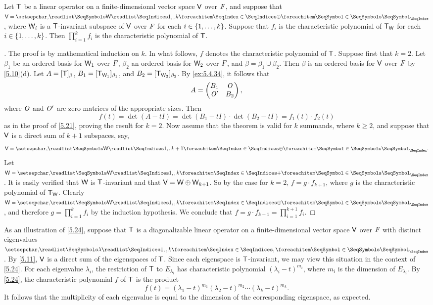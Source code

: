 \begin{thm}\label{5.24}
  Let \(\mathsf{T}\) be a linear operator on a finite-dimensional vector space \(\mathsf{V}\) over \(\mathit{F}\), and suppose that \(\V = \seq[\oplus]{\W}{1,,k}\), where \(\mathsf{W}_i\) is a \(\mathsf{T}\)-invariant subspace of \(\mathsf{V}\) over \(\mathit{F}\) for each \(i \in \left\lbrace1, \dots, k\right\rbrace\).
  Suppose that \(f_i\) is the characteristic polynomial of \(\mathsf{T}_{\mathsf{W}}\) for each \(i \in \left\lbrace1, \dots, k\right\rbrace\).
  Then \(\prod_{i = 1}^k f_i\) is the characteristic polynomial of \(\mathsf{T}\).
\end{thm}

\begin{proof}[]
  The proof is by mathematical induction on \(k\).
  In what follows, \(f\) denotes the characteristic polynomial of \(\mathsf{T}\).
  Suppose first that \(k = 2\).
  Let \(\beta_1\) be an ordered basis for \(\mathsf{W}_1\) over \(\mathit{F}\), \(\beta_2\) an ordered basis for \(\mathsf{W}_2\) over \(\mathit{F}\), and \(\beta = \beta_1 \cup \beta_2\).
  Then \(\beta\) is an ordered basis for \(\mathsf{V}\) over \(\mathit{F}\) by \cref{5.10}(d).
  Let \(A = [\mathsf{T}]_{\beta}\), \(B_1 = [\mathsf{T}_{\mathsf{W}_1}]_{\beta_1}\), and \(B_2 = [\mathsf{T}_{\mathsf{W}_2}]_{\beta_2}\).
  By \cref{ex:5.4.34}, it follows that
  \[
    A = \begin{pmatrix}
      B_1  & \mathit{O} \\
      \mathit{O}' & B_2
    \end{pmatrix},
  \]
  where \(\mathit{O}\) and \(\mathit{O}'\) are zero matrices of the appropriate sizes.
  Then
  \[
    f(t) = \det(A - tI) = \det(B_1 - tI) \cdot \det(B_2 - tI) = f_1(t) \cdot f_2(t)
  \]
  as in the proof of \cref{5.21}, proving the result for \(k = 2\).
  Now assume that the theorem is valid for \(k\) summands, where \(k \geq 2\), and suppose that \(\mathsf{V}\) is a direct sum of \(k + 1\) subspaces, say,
  \[
    \V = \seq[\oplus]{\W}{1,,k+1}.
  \]
  Let \(\W = \seq[+]{\W}{1,,k}\).
  It is easily verified that \(\mathsf{W}\) is \(\mathsf{T}\)-invariant and that \(\mathsf{V} = \mathsf{W} \oplus \mathsf{W}_{k + 1}\).
  So by the case for \(k = 2\), \(f = g \cdot f_{k + 1}\), where \(g\) is the characteristic polynomial of \(\mathsf{T}_{\mathsf{W}}\).
  Clearly \(\W = \seq[\oplus]{\W}{1,,k}\), and therefore \(g = \prod_{i = 1}^k f_i\) by the induction hypothesis.
  We conclude that \(f = g \cdot f_{k + 1} = \prod_{i = 1}^{k + 1} f_i\).
\end{proof}

\begin{note}
  As an illustration of \cref{5.24}, suppose that \(\mathsf{T}\) is a diagonalizable linear operator on a finite-dimensional vector space \(\mathsf{V}\) over \(\mathit{F}\) with distinct eigenvalues \(\seq{\lambda}{1,,k}\).
  By \cref{5.11}, \(\mathsf{V}\) is a direct sum of the eigenspaces of \(\mathsf{T}\).
  Since each eigenspace is \(\mathsf{T}\)-invariant, we may view this situation in the context of \cref{5.24}.
  For each eigenvalue \(\lambda_i\), the restriction of \(\mathsf{T}\) to \(E_{\lambda_i}\) has characteristic polynomial \((\lambda_i - t)^{m_i}\), where \(m_i\) is the dimension of \(E_{\lambda_i}\).
  By \cref{5.24}, the characteristic polynomial \(f\) of \(\mathsf{T}\) is the product
  \[
    f(t) = (\lambda_1 - t)^{m_1} (\lambda_2 - t)^{m_2} \cdots (\lambda_k - t)^{m_k}.
  \]
  It follows that the multiplicity of each eigenvalue is equal to the dimension of the corresponding eigenspace, as expected.
\end{note}

